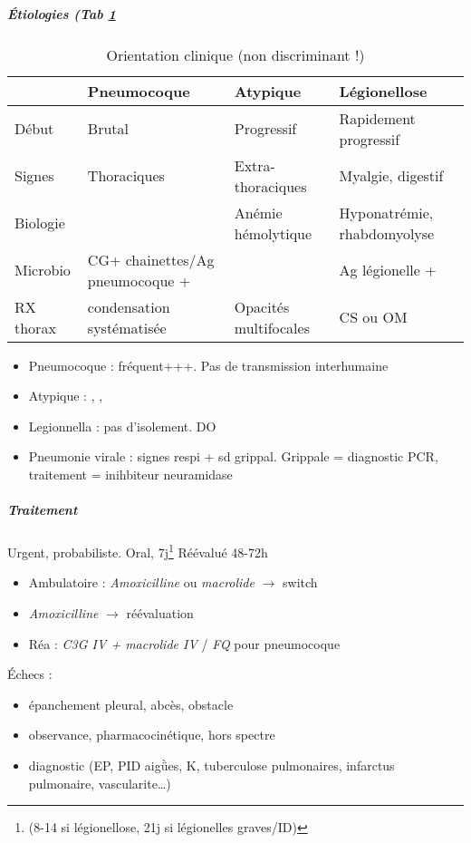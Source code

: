 \documentclass[11pt]{article}
\begin{document}
\subparagraph{Étiologies (Tab \ref{tab:org0bf695a}}
\label{sec:orgce5d6bd}
\begin{table}[htbp]
\caption{\label{tab:org0bf695a}Orientation clinique (non discriminant !)}
\centering
\begin{tabular}{llll}
 & Pneumocoque & Atypique & Légionellose\\
\hline
Début & Brutal & Progressif & Rapidement progressif\\
Signes & Thoraciques & Extra-thoraciques & Myalgie, digestif\\
Biologie &  & Anémie hémolytique & Hyponatrémie, rhabdomyolyse\\
Microbio & CG+ chainettes/Ag pneumocoque + &  & Ag légionelle +\\
RX thorax & condensation systématisée & Opacités multifocales & CS ou OM\\
\end{tabular}
\end{table}
\begin{itemize}
\item Pneumocoque : fréquent+++. Pas de transmission interhumaine
\item Atypique : , , 
\item Legionnella : pas d'isolement. DO
\item Pneumonie virale : signes respi + sd grippal. Grippale = diagnostic PCR, traitement = inihbiteur neuramidase \danger {}
\end{itemize}

\subparagraph{Traitement}
\label{sec:org67e5a1e}
Urgent, probabiliste. Oral, 7j\footnote{(8-14 si légionellose, 21j si légionelles graves/ID)}  Réévalué 48-72h

\begin{itemize}
\item Ambulatoire : \emph{Amoxicilline} ou \emph{macrolide} \(\to\) switch
\item \faHospital  \emph{Amoxicilline} \(\to\) réévaluation
\item Réa : \emph{C3G IV + macrolide IV} / \emph{FQ} pour pneumocoque
\end{itemize}

Échecs : 
\begin{itemize}
\item épanchement pleural, abcès, obstacle
\item observance, pharmacocinétique, hors spectre
\item diagnostic (EP, PID aigǜes, K, tuberculose pulmonaires, infarctus pulmonaire, vascularite\ldots{})
\end{itemize}
\end{document}
